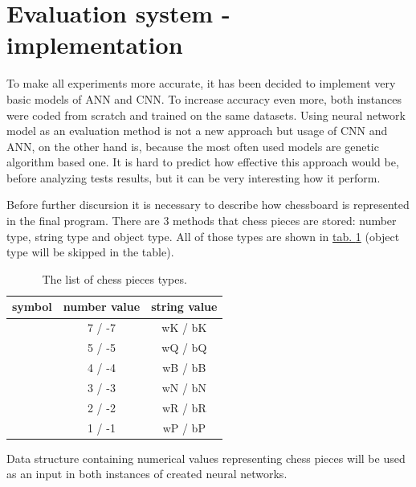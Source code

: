\section{Evaluation system - implementation}\label{sec:evaluation-system-implementation}
To make all experiments more accurate, it has been decided to implement very basic models of ANN and CNN. To increase accuracy even more, both instances were coded from scratch and trained on the same datasets. Using neural network model as an evaluation method is not a new approach but usage of CNN and ANN, on the other hand is, because the most often used models are genetic algorithm based one. It is hard to predict how effective this approach would be, before analyzing tests results, but it can be very interesting how it perform. 

Before further discursion it is necessary to describe how chessboard is represented in the final program. There are $3$ methods that chess pieces are stored: number type, string type and object type. All of those types are shown in \hyperref[tab:chess-pieces-types]{tab. \ref*{tab:chess-pieces-types}} (object type will be skipped in the table).
\begin{table}
	\centering
	\caption{The list of chess pieces types.}
	\label{tab:chess-pieces-types}
	\begin{tabular}{ccc}
	\toprule
		\textbf{symbol} & \textbf{number value} & \textbf{string value}\\
		\hline
			\WhiteKingOnWhite \BlackKingOnWhite & 7 / -7 & wK / bK\\
		\hline
			\WhiteQueenOnWhite \BlackQueenOnWhite & 5 / -5 & wQ / bQ\\
		\hline
			\WhiteBishopOnWhite \BlackBishopOnWhite & 4 / -4 & wB / bB\\
		\hline
			\WhiteKnightOnWhite \BlackKnightOnWhite & 3 / -3 & wN / bN\\
		\hline
			\WhiteRookOnWhite \BlackRookOnWhite & 2 / -2 & wR / bR\\
		\hline
			\WhitePawnOnWhite \BlackPawnOnWhite & 1 / -1 & wP / bP\\
	\end{tabular}
\end{table}
Data structure containing numerical values representing chess pieces will be used as an input in both instances of created neural networks.

